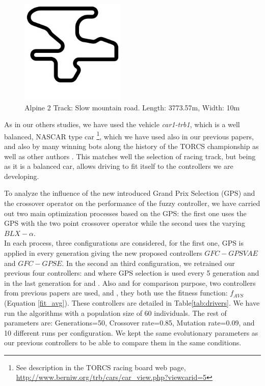 \documentclass[10pt,journal,compsoc]{IEEEtran}
\begin{document}
\begin{figure}[!ht]	
	\begin{center}
		\includegraphics[width=5cm]{fig/alpine2.jpg}
		\caption{Alpine 2 Track: Slow mountain road. Length: 3773.57m, Width: 10m}
		\label{fig:alpine2_track}	
	\end{center}	
\end{figure}

As in our others studies, we have used the vehicle \textit{car1-trb1},
which is a well balanced, NASCAR type car \footnote{See description in
  the TORCS racing board web page,
  \url{http://www.berniw.org/trb/cars/car_view.php?viewcarid=5}},
which we have used also in our previous papers, and also by many
winning bots along the history of the TORCS championship
\cite{torcs5} as well as other authors
\cite{auteur2010,li2019reinforcement}. This matches well the selection
of racing track, but being as it is a balanced car, allows driving to
fit itself to the controllers we are developing.




To analyze the influence of the new introduced Grand Prix Selection (GPS) and the crossover operator on the performance of the fuzzy controller, we have carried out  two main optimization processes based on the GPS: the first one uses the GPS with the two point crossover operator while the second uses the varying $BLX-\alpha$. \\
In each process, three configurations are considered, for the first one, GPS is applied in every generation giving the new proposed controllers $GFC-GPSVAE$ and
$GFC-GPSE$. In the second an third configuration, we retrained our previous four  controllers\cite{DBLP:conf/cig/SalemMG19}: {} and 
{} where GPS selection is used every 5 generation and in the last generation for  {} and 
{}.
Also  and for comparison purpose, two controllers from previous papers are used, {}\cite{DBLP:conf/cig/SalemMG19} and {}\cite{salem_cig2018}, they both use the fitness function: $f_{AVS}$ (Equation \ref{fit_avg}).
These controllers are detailed in Table\ref{tab:drivers}. 
We have run the algorithms with a population size of 60
individuals. The rest of parameters are: Generations=50, Crossover
rate=0.85, Mutation rate=0.09, and 10 different runs per
configuration.  We kept the same evolutionary parameters as our previous controllers  to be able to compare them in the same conditions.
\end{document}
